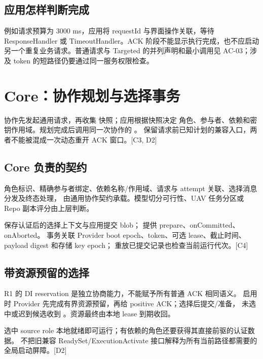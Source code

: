 \subsection{应用怎样判断完成}
例如请求预算为 3000 ms，应用将 requestId 与界面操作关联，等待 ResponseHandler 或 TimeoutHandler。ACK 阶段不能显示执行完成，也不应启动另一个重复业务请求。普通请求与 Targeted 的并列声明和最小调用见 AC-03；涉及 token 的短路径仍要通过同一服务权限检查。

\newpage

\section{Core：协作规划与选择事务}
 协作先发起通用请求，再收集  快照；应用根据快照决定
角色、参与者、依赖和密钥作用域。规划完成后调用同一次协作的 。
 保留请求前已知计划的兼容入口，两者不能被混成一次动态重开 ACK 窗口。[C3, D2]

\subsection{Core 负责的契约}
角色标识、精确参与者绑定、依赖名称/作用域、请求与 attempt 关联、选择消息分发及终态处理，
由通用协作契约承载。模型切分可行性、UAV 任务分区或 Repo 副本评分由上层判断。

 保存认证后的选择上下文与应用提交 blob；
 提供 prepare、onCommitted、onAborted。
事务关联 Provider boot epoch、token、可选 lease、截止时间、payload digest 和存储 key epoch；
重放已提交记录也检查当前运行代次。[C4]

\subsection{带资源预留的选择}
R1 的 DI reservation 是独立协商能力，不能赋予所有普通 ACK 相同语义。
启用时 Provider 先完成有界资源预留，再给 positive ACK；选择后提交/准备，
未选中或迟到候选收到 。资源最终由本地 lease 到期收回。

选中 source role 本地就绪即可运行；有依赖的角色还要获得其直接前驱的认证数据。
不把旧兼容 ReadySet/ExecutionActivate 接口解释为所有当前路径都需要的全局启动屏障。[D2]



